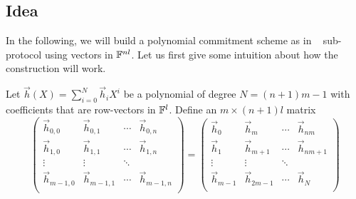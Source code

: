 
\subsection{Idea}

In the following, we will build a polynomial commitment scheme as in \ILC~ sub-protocol using vectors in $\mathbb{F}^{nl}$. Let us first give some intuition about how the construction will work. 

Let $\vec{h}(X)=\sum_{i=0}^N\vec{h}_iX^i$ be a polynomial of degree $N=(n+1)m-1$ with coefficients that are row-vectors in $\mathbb{F}^l$. Define an $m\times (n+1)l$ matrix $$
\left(\begin{array}{llll}
\vec{h}_{0,0} & \vec{h}_{0,1} &\cdots & \vec{h}_{0,n} \\
\vec{h}_{1,0} & \vec{h}_{1,1} & \cdots & \vec{h}_{1,n} \\
\vdots & \vdots &  \ddots & \\
\vec{h}_{m-1,0} & \vec{h}_{m-1,1} & \cdots &\vec{h}_{m-1,n}\\
\end{array} \right) = \left(\begin{array}{llll}
\vec{h}_0 & \vec{h}_{m} & \cdots & \vec{h}_{nm} \\
\vec{h}_1 & \vec{h}_{m+1} & \cdots & \vec{h}_{nm+1}\\
\vdots & \vdots & \ddots  & \\
\vec{h}_{m-1} & \vec{h}_{2m-1}  & \cdots  & \vec{h}_{N} \\
\end{array} \right)$$

